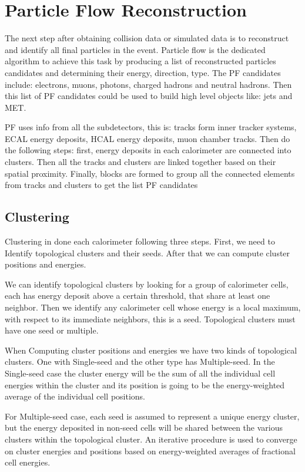 \section{Particle Flow Reconstruction}

The next step after obtaining collision data or simulated data is to reconstruct and identify all final particles in the event. Particle flow is the dedicated algorithm to achieve this task by producing a list of reconstructed particles candidates and determining their energy, direction, type. The PF candidates include: electrons, muons, photons, charged hadrons and neutral hadrons. Then this list of PF candidates could be used to build high level objects like: jets and MET.  

PF uses info from all the subdetectors, this is: tracks form inner tracker systems, ECAL energy deposits, HCAL energy deposits, muon chamber tracks. Then do the following steps: first, energy deposits in each calorimeter are connected into clusters. Then all the tracks and clusters are linked together based on their spatial proximity. Finally, blocks are formed to group all the connected elements from tracks and clusters to get the list PF candidates

\subsection{Clustering}
Clustering in done each calorimeter following three steps. First, we need to Identify topological clusters and their seeds. After that we can compute cluster positions and energies.  

We can identify topological clusters by looking for a group of calorimeter cells, each has energy deposit above a certain threshold, that share at least one neighbor. Then we identify any calorimeter cell whose energy is a local maximum, with respect to its immediate neighbors, this is a seed. Topological clusters must have one seed or multiple. 

When Computing cluster positions and energies we have two kinds of topological clusters. One with Single-seed and the other type has Multiple-seed. In the Single-seed case the cluster energy will be the sum of all the individual cell energies within the cluster and its position is going to be the energy-weighted average of the individual cell positions. 

For Multiple-seed case, each seed is assumed to represent a unique energy cluster, but the energy deposited in non-seed cells will be shared between the various clusters within the topological cluster.  An iterative procedure is used to converge on cluster energies and positions based on energy-weighted averages of fractional cell energies.

